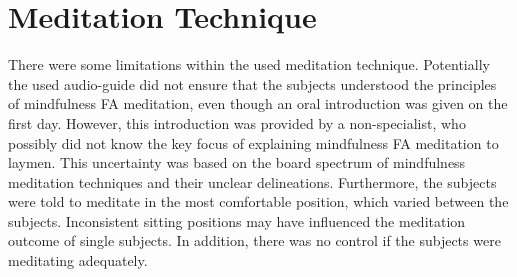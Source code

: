 \section{Meditation Technique}
%



There were some limitations within the used meditation technique. Potentially the used audio-guide did not ensure that the subjects understood the principles of mindfulness FA meditation, even though an oral introduction was given on the first day. However, this introduction was provided by a non-specialist, who possibly did not know the key focus of explaining mindfulness FA meditation to laymen. This uncertainty was based on the board spectrum of mindfulness meditation techniques and their unclear delineations. Furthermore, the subjects were told to meditate in the most comfortable position, which varied between the subjects. Inconsistent sitting positions may have influenced the meditation outcome of single subjects. In addition, there was no control if the subjects were meditating adequately.

